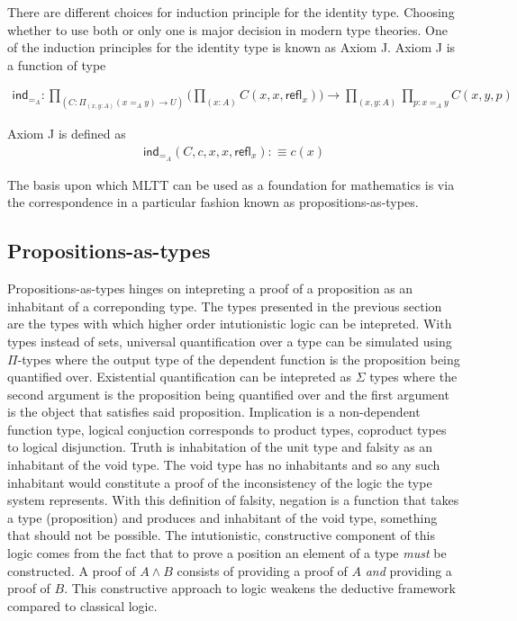 There are different choices for induction principle for the identity type.
Choosing whether to use both or only one is major decision in modern type
theories. One of the induction principles for the identity type is known as
\textsf{Axiom J}. \textsf{Axiom J} is a function of type

\begin{align*}
    \textsf{ind}_{=_{A}} : \prod_{(C : \Pi_{(x,y : A)}(x=_{A}y)\rightarrow
    U)}\bigg(\prod_{(x : A)}C(x,x,\textsf{refl}_{x})\bigg) \rightarrow
    \prod_{(x,y:A)}\prod_{p:x=_{A}y}C(x,y,p)
\end{align*}

\textsf{Axiom J} is defined as
\begin{align*}
    \textsf{ind}_{=_{A}} (C,c,x,x,\textsf{refl}_{x}) :\equiv c(x)
\end{align*}


The basis upon which MLTT can be used as a foundation for mathematics is via the
\cuho{} correspondence in a particular fashion known as
propositions-as-types.

\subsection{Propositions-as-types}
Propositions-as-types hinges on intepreting a proof of a proposition as an
inhabitant of a correponding type. The types presented in the previous section
are the types with which higher order intutionistic logic can be intepreted.
With types instead of sets, universal quantification over a type can be
simulated using $\Pi$-types where the output type of the dependent function is
the proposition being quantified over. Existential quantification can be
intepreted as $\Sigma$ types where the second argument is the proposition being
quantified over and the first argument is the object that satisfies said
proposition. Implication is a non-dependent function type, logical conjuction
corresponds to product types, coproduct types to logical disjunction. Truth is
inhabitation of the unit type and falsity as an inhabitant of the void type. The
void type has no inhabitants and so any such inhabitant would constitute a proof
of the inconsistency of the logic the type system represents. With this
definition of falsity, negation is a function that takes a type (proposition)
and produces and inhabitant of the void type, something that should not be
possible. The intutionistic, constructive component of this logic comes from the
fact that to prove a position an element of a type \textit{must} be constructed.
A proof of $A \land B$ consists of providing a proof of $A$ \textit{and}
providing a proof of $B$. This constructive approach to logic weakens the
deductive framework compared to classical logic.


